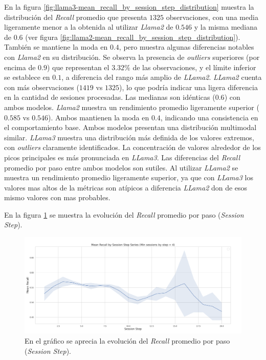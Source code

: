 \documentclass[11pt,a4paper,twoside]{thesis}
\begin{document}
En la figura \ref{fig:llama3-mean_recall_by_session_step_distribution} muestra la distribución del \textit{Recall} promedio que presenta $1325$ observaciones, con una media ligeramente menor a la obtenida al utilizar \textit{Llama2} de $0.546$ y la misma mediana de $0.6$ (ver figura \ref{fig:llama2-mean_recall_by_session_step_distribution}). También se mantiene la moda en $0.4$, pero muestra algunas diferencias notables con \textit{Llama2} en su distribución. Se observa la presencia de \textit{outliers} superiores (por encima de $0.9$) que representan el $3.32\%$ de las observaciones, y el límite inferior se establece en $0.1$, a diferencia del rango más amplio de \textit{LLama2}. \textit{LLama2} cuenta con más observaciones ($1419$ vs $1325$), lo que podría indicar una ligera diferencia en la cantidad de sesiones procesadas. Las medianas son idénticas ($0.6$) con ambos modelos. \textit{Llama2} muestra un rendimiento promedio ligeramente superior ($0.585$ vs $0.546$). Ambos mantienen la moda en $0.4$, indicando una consistencia en el comportamiento base. Ambos modelos presentan una distribución multimodal similar. \textit{LLama3} muestra una distribución más definida de los valores extremos, con \textit{outliers} claramente identificados. La concentración de valores alrededor de los picos principales es más pronunciada en \textit{LLama3}. Las diferencias del \textit{Recall} promedio por paso entre ambos modelos son sutiles. Al utilizar \textit{LLama2} se muestra un rendimiento promedio ligeramente superior, ya que con \textit{LLama3} los valores mas altos de la métricas son atípicos a diferencia
\textit{LLama2} don de esos mismo valores con mas probables.

\clearpage

En la figura \ref{fig:llama3-mean_recall_by_session_step_series} se muestra la evolución del \textit{Recall} promedio por paso (\textit{Session Step}).

\begin{figure}[H]
	\centering
	\includegraphics[width=15cm]{./images/llama3/mean_recall_by_session_step_series.png}
	\caption{En el gráfico se aprecia la evolución del \textit{Recall} promedio por paso (\textit{Session Step}).}
	\label{fig:llama3-mean_recall_by_session_step_series}
\end{figure}
\end{document}
